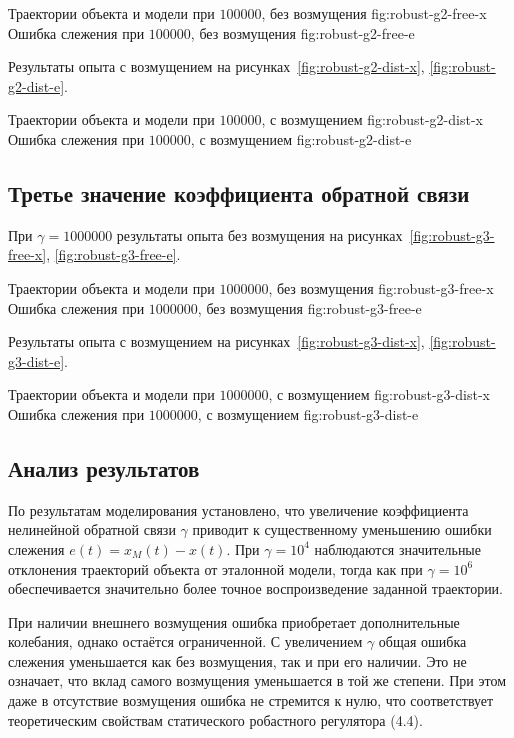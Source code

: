   {Траектории объекта и модели при $100000$, без возмущения}
  {fig:robust-g2-free-x}
  {Ошибка слежения при $100000$, без возмущения}
  {fig:robust-g2-free-e}

Результаты опыта с возмущением
на рисунках~\ref{fig:robust-g2-dist-x}, \ref{fig:robust-g2-dist-e}.

  {Траектории объекта и модели при $100000$, с возмущением}
  {fig:robust-g2-dist-x}
  {Ошибка слежения при $100000$, с возмущением}
  {fig:robust-g2-dist-e}

\subsection{Третье значение коэффициента обратной связи}

При $\gamma=1000000$ результаты опыта без возмущения
на рисунках~\ref{fig:robust-g3-free-x}, \ref{fig:robust-g3-free-e}.

  {Траектории объекта и модели при $1000000$, без возмущения}
  {fig:robust-g3-free-x}
  {Ошибка слежения при $1000000$, без возмущения}
  {fig:robust-g3-free-e}

Результаты опыта с возмущением
на рисунках~\ref{fig:robust-g3-dist-x}, \ref{fig:robust-g3-dist-e}.

  {Траектории объекта и модели при $1000000$, с возмущением}
  {fig:robust-g3-dist-x}
  {Ошибка слежения при $1000000$, с возмущением}
  {fig:robust-g3-dist-e}

\subsection{Анализ результатов}

По результатам моделирования установлено, что увеличение коэффициента нелинейной обратной связи \(\gamma\) приводит к существенному уменьшению ошибки слежения \(e(t)=x_M(t)-x(t)\). При \(\gamma=10^4\) наблюдаются значительные отклонения траекторий объекта от эталонной модели, тогда как при \(\gamma=10^6\) обеспечивается значительно более точное воспроизведение заданной траектории.

При наличии внешнего возмущения ошибка приобретает дополнительные колебания, однако остаётся ограниченной. С увеличением \(\gamma\) общая ошибка слежения уменьшается как без возмущения, так и при его наличии. Это не означает, что вклад самого возмущения уменьшается в той же степени. При этом даже в отсутствие возмущения ошибка не стремится к нулю, что соответствует теоретическим свойствам статического робастного регулятора (4.4).

